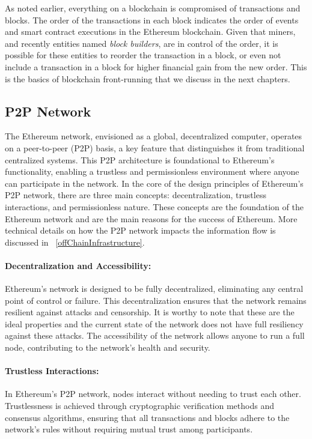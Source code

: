 As noted earlier, everything on a blockchain is compromised of transactions and blocks. The order of the transactions in each block indicates the order of events and smart contract executions in the Ethereum blockchain. Given that miners, and recently entities named \textit{block builders}, are in control of the order, it is possible for these entities to reorder the transaction in a block, or even not include a transaction in a block for higher financial gain from the new order. This is the basics of blockchain front-running that we discuss in the next chapters. 


\subsection{P2P Network}
The Ethereum network, envisioned as a global, decentralized computer, operates on a peer-to-peer (P2P) basis, a key feature that distinguishes it from traditional centralized systems. This P2P architecture is foundational to Ethereum's functionality, enabling a trustless and permissionless environment where anyone can participate in the network. In the core of the design principles of Ethereum's P2P network, there are three main concepts: decentralization, trustless interactions, and permissionless nature. These concepts are the foundation of the Ethereum network and are the main reasons for the success of Ethereum. More technical details on how the P2P network impacts the information flow is discussed in ~\ref{offChainInfrastructure}.

\paragraph{Decentralization and Accessibility:} Ethereum's network is designed to be fully decentralized, eliminating any central point of control or failure. This decentralization ensures that the network remains resilient against attacks and censorship. It is worthy to note that these are the ideal properties and the current state of the network does not have full resiliency against these attacks. The accessibility of the network allows anyone to run a full node, contributing to the network's health and security.

\paragraph{Trustless Interactions:} In Ethereum's P2P network, nodes interact without needing to trust each other. Trustlessness is achieved through cryptographic verification methods and consensus algorithms, ensuring that all transactions and blocks adhere to the network's rules without requiring mutual trust among participants.

